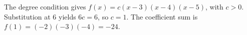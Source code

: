 The degree condition gives $f(x)=c(x-3)(x-4)(x-5)$, with $c>0$. Substitution at $6$ yields $6c=6$, so $c=1$. The coefficient sum is $f(1)=(-2)(-3)(-4)=\boxed{-24}$.

